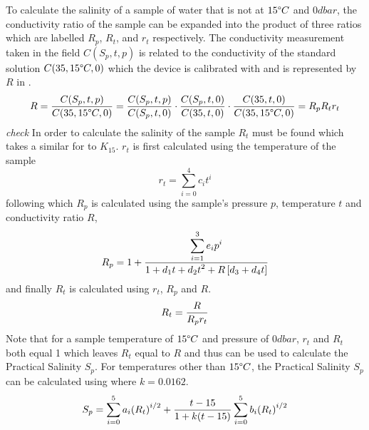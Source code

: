To calculate the salinity of a sample of water that is not at $15\degree C$ and $0 dbar$, the conductivity ratio of the sample can be expanded into the product of three ratios which are labelled $R_p$, $R_t$, and $r_t$ respectively.
The conductivity measurement taken in the field $C(S_p, t, p)$ is related to the conductivity of the standard solution $C(35, 15\degree C, 0)$ which the device is calibrated with and is represented by $R$ in .~\cite{ioc_teos_2010}
\begin{equation}\label{eqn:pss-78-full-ratio}
    R = \frac{\displaystyle C(S_p, t, p)}{\displaystyle C(35, 15\degree C, 0)} = \frac{\displaystyle C(S_p, t, p)}{\displaystyle C(S_p, t, 0)} \cdot \frac{\displaystyle C(S_p, t, 0)}{\displaystyle C(35, t, 0)} \cdot \frac{\displaystyle C(35, t, 0)}{\displaystyle C(35, 15\degree C, 0)} = R_p R_t r_t
\end{equation}
\textit{check}
In order to calculate the salinity of the sample $R_t$ must be found which takes a similar for to $K_{15}$.
$r_t$ is first calculated using the temperature of the sample 
\begin{equation}\label{eqn:pss-78-rt}
    r_t = \sum_{i=0}^{4} c_i {t}^i
\end{equation}
following which $R_p$ is calculated using the sample's pressure $p$, temperature $t$ and conductivity ratio $R$,
\begin{equation}\label{eqn:pss-78-rp}
    R_p = 1 + \frac{\displaystyle \sum_{i=1}^{3} e_i p^i}{\displaystyle 1 + d_1 t + d_2 {t}^2 + R\left[ d_3 + d_4 t \right]}
\end{equation}
and finally $R_t$ is calculated using $r_t$, $R_p$ and $R$.
\begin{equation}\label{eqn:pss-78-Rt}
    R_t = \frac{\displaystyle R}{\displaystyle R_p r_t}
\end{equation}
Note that for a sample temperature of $15\degree C$ and pressure of $0 dbar$, $r_t$ and $R_t$ both equal 1 which leaves $R_t$ equal to $R$ and thus  can be used to calculate the Practical Salinity $S_p$.
For temperatures other than $15\degree C$, the Practical Salinity $S_p$ can be calculated using  where $k = 0.0162$.~\cite{ioc_teos_2010}
\begin{equation}\label{eqn:pss-78-full}
    S_p = \sum_{i=0}^{5} a_i {(R_t)}^{i/2} + \frac{\displaystyle t-15}{\displaystyle 1+k(t-15)} \sum_{i=0}^{5} b_i {(R_t)}^{i/2}
\end{equation}

